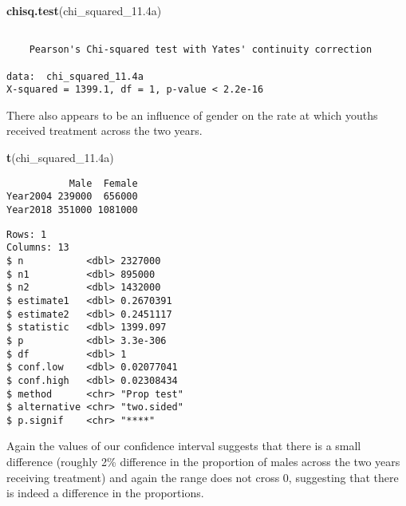 \documentclass[
]{article}
\newenvironment{Shaded}{\begin{snugshade}}{\end{snugshade}}
\newcommand{\DataTypeTok}[1]{\textcolor[rgb]{0.13,0.29,0.53}{#1}}
\newcommand{\FloatTok}[1]{\textcolor[rgb]{0.00,0.00,0.81}{#1}}
\newcommand{\KeywordTok}[1]{\textcolor[rgb]{0.13,0.29,0.53}{\textbf{#1}}}
\newcommand{\NormalTok}[1]{#1}
\newcommand{\OperatorTok}[1]{\textcolor[rgb]{0.81,0.36,0.00}{\textbf{#1}}}
\newcommand{\OtherTok}[1]{\textcolor[rgb]{0.56,0.35,0.01}{#1}}
\newcommand{\StringTok}[1]{\textcolor[rgb]{0.31,0.60,0.02}{#1}}
\begin{document}
\begin{Shaded}
\begin{Highlighting}[]
\KeywordTok{chisq.test}\NormalTok{(chi_squared_}\FloatTok{11.4}\NormalTok{a)}
\end{Highlighting}
\end{Shaded}

\begin{verbatim}

    Pearson's Chi-squared test with Yates' continuity correction

data:  chi_squared_11.4a
X-squared = 1399.1, df = 1, p-value < 2.2e-16
\end{verbatim}

There also appears to be an influence of gender on the rate at which
youths received treatment across the two years.

\begin{Shaded}
\begin{Highlighting}[]
\KeywordTok{t}\NormalTok{(chi_squared_}\FloatTok{11.4}\NormalTok{a) }
\end{Highlighting}
\end{Shaded}

\begin{verbatim}
           Male  Female
Year2004 239000  656000
Year2018 351000 1081000
\end{verbatim}

\begin{Shaded}
\end{Shaded}

\begin{verbatim}
Rows: 1
Columns: 13
$ n           <dbl> 2327000
$ n1          <dbl> 895000
$ n2          <dbl> 1432000
$ estimate1   <dbl> 0.2670391
$ estimate2   <dbl> 0.2451117
$ statistic   <dbl> 1399.097
$ p           <dbl> 3.3e-306
$ df          <dbl> 1
$ conf.low    <dbl> 0.02077041
$ conf.high   <dbl> 0.02308434
$ method      <chr> "Prop test"
$ alternative <chr> "two.sided"
$ p.signif    <chr> "****"
\end{verbatim}

Again the values of our confidence interval suggests that there is a
small difference (roughly 2\% difference in the proportion of males
across the two years receiving treatment) and again the range does not
cross 0, suggesting that there is indeed a difference in the
proportions.
\end{document}
